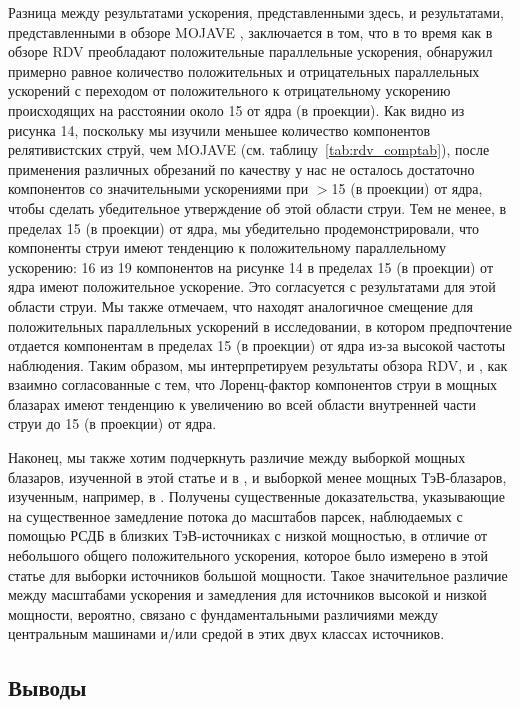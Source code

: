 Разница между результатами ускорения, представленными здесь, и результатами, представленными в
обзоре MOJAVE \cite{Homan_2009}, заключается в том, что в то время как в обзоре RDV преобладают
положительные параллельные ускорения, \cite{Homan_2009} обнаружил примерно равное количество
положительных и отрицательных параллельных ускорений с переходом от положительного к отрицательному
ускорению происходящих на расстоянии около \SI{15}{\parsec} от ядра (в проекции). Как видно из
рисунка 14, поскольку мы изучили меньшее количество компонентов релятивистских струй, чем MOJAVE
(см. таблицу~\ref{tab:rdv_comptab}), после применения различных обрезаний по качеству у ​​нас не
осталось достаточно компонентов со значительными ускорениями при $>$\SI{15}{\parsec} (в проекции) от
ядра, чтобы сделать убедительное утверждение об этой области струи. Тем не менее, в пределах
\SI{15}{\parsec} (в проекции) от ядра, мы убедительно продемонстрировали, что компоненты струи
имеют тенденцию к положительному параллельному ускорению: 16 из 19 компонентов на рисунке 14 в
пределах \SI{15}{\parsec} (в проекции) от ядра имеют положительное ускорение. Это согласуется с
результатами \cite{Homan_2009} для этой области струи. Мы также отмечаем, что \cite{Jorstad_2005}
находят аналогичное смещение для положительных параллельных ускорений в исследовании, в котором
предпочтение отдается компонентам в пределах \SI{15}{\parsec} (в проекции) от ядра из-за высокой
частоты наблюдения. Таким образом, мы интерпретируем результаты обзора RDV, \cite{Homan_2009} и
\cite{Jorstad_2005}, как взаимно согласованные с тем, что Лоренц-фактор компонентов струи в
мощных блазарах имеют тенденцию к увеличению во всей области внутренней части струи до
\SI{15}{\parsec} (в проекции) от ядра.

Наконец, мы также хотим подчеркнуть различие между выборкой мощных блазаров, изученной в этой
статье и в \cite{Piner_2007}, и выборкой менее мощных ТэВ-блазаров, изученным, например, в
\cite{Piner_2010}. Получены существенные доказательства, указывающие на существенное замедление
потока до масштабов парсек, наблюдаемых с помощью РСДБ в близких ТэВ-источниках с низкой мощностью,
в отличие от небольшого общего положительного ускорения, которое было измерено в этой статье для
выборки источников большой мощности. Такое значительное различие между масштабами ускорения и
замедления для источников высокой и низкой мощности, вероятно, связано с фундаментальными различиями
между центральным машинами и/или средой в этих двух классах источников.

\subsection{Выводы}

